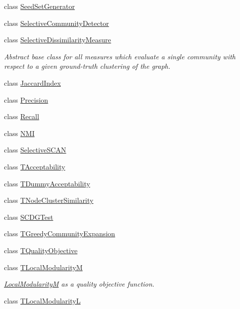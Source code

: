 \begin{DoxyCompactItemize}
class \hyperlink{class_networ_kit_1_1_seed_set_generator}{Seed\-Set\-Generator}
\item 
class \hyperlink{class_networ_kit_1_1_selective_community_detector}{Selective\-Community\-Detector}
\item 
class \hyperlink{class_networ_kit_1_1_selective_dissimilarity_measure}{Selective\-Dissimilarity\-Measure}
\begin{DoxyCompactList}\small\item\em Abstract base class for all measures which evaluate a single community with respect to a given ground-\/truth clustering of the graph. \end{DoxyCompactList}\item 
class \hyperlink{class_networ_kit_1_1_jaccard_index}{Jaccard\-Index}
\item 
class \hyperlink{class_networ_kit_1_1_precision}{Precision}
\item 
class \hyperlink{class_networ_kit_1_1_recall}{Recall}
\item 
class \hyperlink{class_networ_kit_1_1_n_m_i}{N\-M\-I}
\item 
class \hyperlink{class_networ_kit_1_1_selective_s_c_a_n}{Selective\-S\-C\-A\-N}
\item 
class \hyperlink{class_networ_kit_1_1_t_acceptability}{T\-Acceptability}
\item 
class \hyperlink{class_networ_kit_1_1_t_dummy_acceptability}{T\-Dummy\-Acceptability}
\item 
class \hyperlink{class_networ_kit_1_1_t_node_cluster_similarity}{T\-Node\-Cluster\-Similarity}
\item 
class \hyperlink{class_networ_kit_1_1_s_c_d_g_test}{S\-C\-D\-G\-Test}
\item 
class \hyperlink{class_networ_kit_1_1_t_greedy_community_expansion}{T\-Greedy\-Community\-Expansion}
\item 
class \hyperlink{class_networ_kit_1_1_t_quality_objective}{T\-Quality\-Objective}
\item 
class \hyperlink{class_networ_kit_1_1_t_local_modularity_m}{T\-Local\-Modularity\-M}
\begin{DoxyCompactList}\small\item\em \hyperlink{class_networ_kit_1_1_local_modularity_m}{Local\-Modularity\-M} as a quality objective function. \end{DoxyCompactList}\item 
class \hyperlink{class_networ_kit_1_1_t_local_modularity_l}{T\-Local\-Modularity\-L}
\item 

\end{DoxyCompactItemize}
